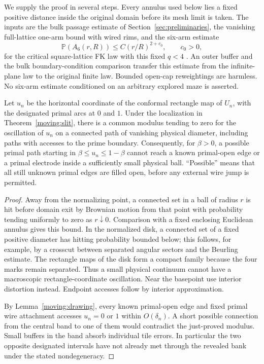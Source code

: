 We supply the proof in several steps.  Every annulus used below lies
a fixed positive distance inside the original domain before its mesh
limit is taken.  The inputs are the bulk passage estimate of
Section~\ref{sec:preliminaries}, the vanishing full-lattice one-arm
bound with wired rims, and the six-arm estimate
\begin{equation}\label{moving:sixarm}
 \mathbb P(A_6(r,R))\le C(r/R)^{2+c_0},\qquad c_0>0,
\end{equation}
for the critical square-lattice FK law with this fixed $q<4$
\cite[Corollary~6.7]{DMT2021Fractal}.  An outer buffer and the bulk
boundary-condition comparison transfer this estimate from the
infinite-plane law to the original finite law.  Bounded open-cap
reweightings are harmless.  No six-arm estimate conditioned on an
arbitrary explored maze is asserted.

\begin{lemma}\label{moving:chart-modulus}
Let $u_n$ be the horizontal coordinate of the conformal rectangle
map of $U_n$, with the designated primal arcs at $0$ and $1$.
Under the localization in Theorem~\ref{moving:slit}, there is a common
modulus tending to zero for the oscillation of $u_n$ on a connected
path of vanishing physical diameter, including paths with accesses
to the prime boundary.  Consequently, for $\beta>0$, a possible
primal path starting in $\beta\le u_n\le1-\beta$ cannot reach a known
primal-open edge or a primal electrode inside a sufficiently small
physical ball.  ``Possible'' means that all still unknown primal
edges are filled open, before any external wire jump is permitted.
\end{lemma}
\begin{proof}
Away from the normalizing point, a connected set in a ball of radius
$r$ is hit before domain exit by Brownian motion from that point
with probability tending uniformly to zero as $r\downarrow0$.
Comparison with a fixed enclosing Euclidean annulus gives this
bound.  In the normalized disk, a connected set of a fixed positive
diameter has hitting probability bounded below; this follows, for
example, by a crosscut between separated angular sectors and the
Beurling estimate.  The rectangle maps of the disk form a compact
family because the four marks remain separated.  Thus a small
physical continuum cannot have a macroscopic rectangle-coordinate
oscillation.  Near the basepoint use interior distortion instead.
Endpoint accesses follow by interior approximation.

By Lemma~\ref{moving:drawing}, every known primal-open edge and fixed
primal wire attachment accesses $u_n=0$ or $1$ within
$O(\delta_n)$.  A short possible connection from the central band to
one of them would contradict the just-proved modulus.  Small buffers
in the band absorb individual tile errors.  In particular the two
opposite designated intervals have not already met through the
revealed bank under the stated nondegeneracy.
\end{proof}

